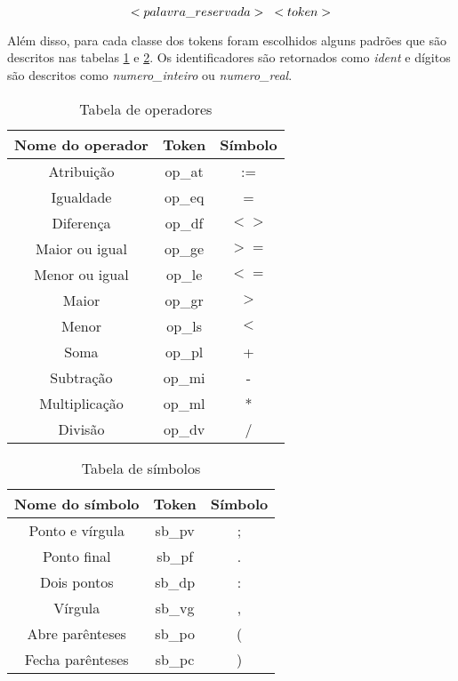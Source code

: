 \documentclass {article}
\begin{document}
		\begin{equation}
			<palavra\_reservada> \hspace{3mm} <token> \nonumber
		\end{equation}
		
		Além disso, para cada classe dos tokens foram escolhidos alguns padrões que são descritos nas tabelas \ref{tb_op} e \ref{tb_sb}. Os identificadores são retornados como \emph{ident} e dígitos são descritos como \emph{numero\_inteiro} ou \emph{numero\_real}.
		
		\begin{table}[ht]
		
		\centering
		\begin{tabular}{ccc}
			\toprule
			Nome do operador & Token & Símbolo\\
			\hline
			\hline
				Atribuição & op\_at & := \\
				Igualdade & op\_eq & = \\ 
				Diferença &  op\_df & $<>$ \\ 
				Maior ou igual & op\_ge & $>=$ \\ 
				Menor ou igual & op\_le & $<=$ \\ 
				Maior & op\_gr & $>$ \\
				Menor &op\_ls & $<$ \\ 
				Soma & op\_pl & + \\ 
				Subtração & op\_mi & - \\ 
				Multiplicação & op\_ml & * \\
				Divisão & op\_dv & / \\
			\bottomrule
		\end{tabular}
		\caption{Tabela de operadores}
		\label{tb_op}
		
		\end{table}		\begin{table}[ht]
		
		\centering
		\begin{tabular}{ccc}
			\toprule
			Nome do símbolo & Token & Símbolo\\
			\hline
			\hline
				Ponto e vírgula & sb\_pv & ; \\
				Ponto final &  sb\_pf & . \\ 
				Dois pontos & sb\_dp & : \\ 
				Vírgula & sb\_vg & , \\
				Abre parênteses &sb\_po & ( \\ 
				Fecha parênteses & sb\_pc & ) \\ 
			\bottomrule
		\end{tabular}
		\caption{Tabela de símbolos}
		\label{tb_sb}
		
		\end{table}
		
\end{document}
